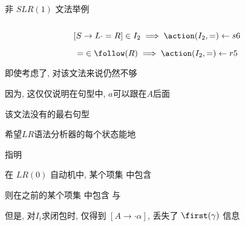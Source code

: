 \begin{frame}{}
  \begin{center}
    非 $SLR(1)$ 文法举例
  \end{center}

  \begin{columns}
  \end{columns}

  \vspace{0.30cm}
  \[
    [S \to L \cdot = R] \in I_{2} \implies \action(I_{2}, =) \gets s6
  \]

  \[
    =\; \in \follow(R) \implies \action(I_{2}, =) \gets r5
  \]
\end{frame}

\begin{frame}{}
  \begin{center}
    即使考虑了, 对该文法来说仍然不够

    \vspace{0.20cm}
    因为, 这仅仅说明在句型中, $a$可以跟在$A$后面


    该文法没有的最右句型
  \end{center}
\end{frame}

\begin{frame}{}
  \begin{center}
    希望$LR$语法分析器的每个状态能地

    \vspace{0.30cm}
    指明

    \pause
    \vspace{1.00cm}
    在 $LR(0)$ 自动机中, 某个项集  中包含 

    \vspace{0.50cm}
    则在之前的某个项集  中包含 
    与 

    \vspace{0.50cm}

    \pause
    \vspace{0.80cm}
    但是, 对$I_{i}$求闭包时, 仅得到 $[A \to \cdot \alpha]$, 丢失了 $\first(\gamma)$ 信息
  \end{center}
\end{frame}

